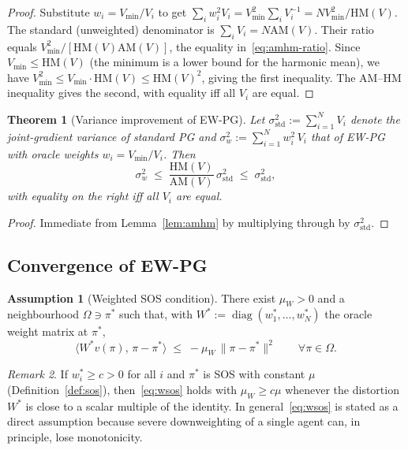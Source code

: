 \documentclass{article}
\theoremstyle{plain}
\newtheorem{theorem}{Theorem}[section]
\theoremstyle{definition}
\newtheorem{assumption}{Assumption}
\theoremstyle{remark}
\newtheorem{remark}[theorem]{Remark}
\newcommand{\HM}{\mathrm{HM}}
\newcommand{\AM}{\mathrm{AM}}
\DeclareMathOperator{\diag}{diag}
\begin{document}
\begin{proof}
Substitute $w_i=V_{\min}/V_i$ to get $\sum_i w_i^2 V_i = V_{\min}^2 \sum_i V_i^{-1} = N V_{\min}^2/\HM(V)$. The standard (unweighted) denominator is $\sum_i V_i = N\AM(V)$. Their ratio equals $V_{\min}^2/[\HM(V)\AM(V)]$, the equality in~\eqref{eq:amhm-ratio}. Since $V_{\min}\le\HM(V)$ (the minimum is a lower bound for the harmonic mean), we have $V_{\min}^2\le V_{\min}\cdot\HM(V)\le\HM(V)^2$, giving the first inequality. The AM--HM inequality \citep[\S2.5]{HardyLittlewoodPolya1952} gives the second, with equality iff all $V_i$ are equal.
\end{proof}

\begin{theorem}[Variance improvement of EW-PG]\label{thm:ew-var}
Let $\sigma^2_{\mathrm{std}} := \sum_{i=1}^N V_i$ denote the joint-gradient variance of standard PG and $\sigma^2_w := \sum_{i=1}^N w_i^2\,V_i$ that of EW-PG with oracle weights $w_i=V_{\min}/V_i$. Then
\begin{equation}\label{eq:ewvar}
\sigma^2_w \;\le\; \frac{\HM(V)}{\AM(V)}\,\sigma^2_{\mathrm{std}} \;\le\; \sigma^2_{\mathrm{std}},
\end{equation}
with equality on the right iff all $V_i$ are equal.
\end{theorem}

\begin{proof}
Immediate from Lemma~\ref{lem:amhm} by multiplying through by $\sigma^2_{\mathrm{std}}$.
\end{proof}

\subsection{Convergence of EW-PG}

\begin{assumption}[Weighted SOS condition]\label{as:wsos}
There exist $\mu_W>0$ and a neighbourhood $\Omega\ni\pi^\ast$ such that, with $W^\ast := \diag(w_1^\ast,\ldots,w_N^\ast)$ the oracle weight matrix at $\pi^\ast$,
\begin{equation}\label{eq:wsos}
\langle W^\ast v(\pi),\,\pi-\pi^\ast\rangle \;\le\; -\mu_W\,\|\pi-\pi^\ast\|^2 \qquad \forall\pi\in\Omega.
\end{equation}
\end{assumption}

\begin{remark}
If $w_i^\ast\ge c>0$ for all $i$ and $\pi^\ast$ is SOS with constant $\mu$ (Definition~\ref{def:sos}), then~\eqref{eq:wsos} holds with $\mu_W\ge c\mu$ whenever the distortion $W^\ast$ is close to a scalar multiple of the identity. In general~\eqref{eq:wsos} is stated as a direct assumption because severe downweighting of a single agent can, in principle, lose monotonicity.
\end{remark}
\end{document}
